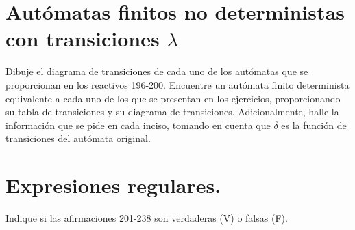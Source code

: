 \documentclass[12pt]{article}
\begin{document}
\section*{Autómatas finitos no deterministas con transiciones $\lambda$}
Dibuje el diagrama de transiciones de cada uno de los autómatas que se proporcionan en los reactivos 196-200. Encuentre un autómata finito determinista equivalente a cada uno de los que se presentan en los ejercicios, proporcionando su tabla de transiciones y su diagrama de transiciones. Adicionalmente, halle la información que se pide en cada inciso, tomando en cuenta que $\delta$ es la función de transiciones del autómata original.
\newpage
\centering\section*{Expresiones regulares.}
Indique si las afirmaciones 201-238 son verdaderas (V) o falsas (F).
\end{document}
